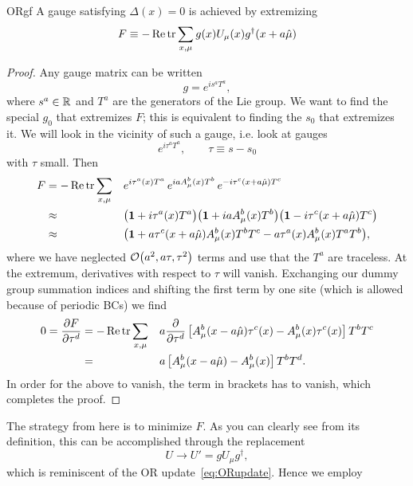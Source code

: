 \begin{proposition}{}{ORgf}
A gauge satisfying $\Delta(x)=0$ is achieved by extremizing
$$
  F\equiv-\mathop{\mathrm{Re}}\tr\sum_{x,\mu} g(x) U_\mu(x) g^\dagger(x+a\hat{\mu})
$$
\begin{proof}
Any gauge matrix can be written
$$
  g=e^{is^aT^a},
$$
where $s^a\in\mathbb{R}$ and $T^a$ are the generators of the Lie group. We want
to find the special $g_0$ that extremizes $F$; this is equivalent to finding
the $s_0$ that extremizes it. We will look in the vicinity of such a
gauge, i.e. look at gauges 
$$e^{i\tau^a T^a}, \qquad\tau\equiv s-s_0$$
with $\tau$ small. Then
\begin{equation*}\begin{aligned}
  F&=-\mathop{\mathrm{Re}}\tr\sum_{x,\mu}&&
      e^{i\tau^a(x)T^a}\,e^{iaA^b_\mu(x)T^b}\,e^{-i\tau^c(x+a\hat\mu)T^c}\\
   &\approx &&\big({\mathbf 1}+i\tau^a(x)T^a\big)
        \big({\mathbf 1}+iaA_\mu^b(x)T^b\big)
        \big({\mathbf 1}-i\tau^c(x+a\hat\mu)T^c\big)\\
   &\approx && \big({\mathbf 1}+a\tau^c(x+a\hat\mu)A_\mu^b(x)T^bT^c
                       -a\tau^a(x)A_\mu^b(x)T^aT^b\big),
\end{aligned}\end{equation*} 
where we have neglected $\order{a^2, a\tau, \tau^2}$ terms and use that
the $T^a$ are traceless. At the extremum, derivatives with respect to $\tau$
will vanish. Exchanging our dummy group summation indices and shifting
the first term by one site (which is allowed because of 
periodic BCs) we find
\begin{equation*}\begin{aligned}
  0=\pdv{F}{\tau^d}
     &=-\mathop{\mathrm{Re}}\tr\sum_{x,\mu}&&a\pdv{\tau^d}
        \left[A_\mu^b(x-a\hat\mu)\tau^c(x)-A_\mu^b(x)\tau^c(x)\right]T^bT^c\\
     &= &&a\left[A_\mu^b(x-a\hat\mu)-A_\mu^b(x)\right]T^bT^d.
\end{aligned}\end{equation*}
In order for the above to vanish, the term in brackets has to vanish,
which completes the proof.
\end{proof}
\end{proposition}
The strategy from here is to minimize $F$. As you can clearly see from
its definition, this can be accomplished through the replacement
\begin{equation}\label{eq:gfORupdate}
U\to U'=gU_\mu g^\dagger,
\end{equation}
which is reminiscent of the OR update~\eqref{eq:ORupdate}. Hence we employ
